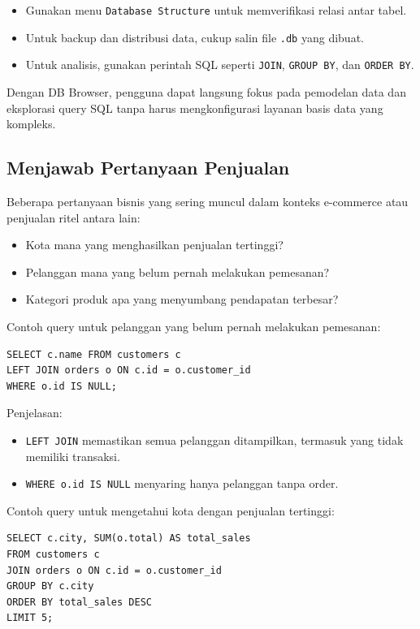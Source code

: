 \begin{itemize}
\item Gunakan menu \texttt{Database Structure} untuk memverifikasi relasi antar tabel.
\item Untuk backup dan distribusi data, cukup salin file \texttt{.db} yang dibuat.
\item Untuk analisis, gunakan perintah SQL seperti \texttt{JOIN}, \texttt{GROUP BY}, dan \texttt{ORDER BY}.
\end{itemize}

Dengan DB Browser, pengguna dapat langsung fokus pada pemodelan data dan eksplorasi query SQL tanpa harus mengkonfigurasi layanan basis data yang kompleks.



\subsection{Menjawab Pertanyaan Penjualan}

Beberapa pertanyaan bisnis yang sering muncul dalam konteks e-commerce atau penjualan ritel antara lain:

\begin{itemize}
	\item Kota mana yang menghasilkan penjualan tertinggi?
	\item Pelanggan mana yang belum pernah melakukan pemesanan?
\item Kategori produk apa yang menyumbang pendapatan terbesar?
\end{itemize}

Contoh query untuk pelanggan yang belum pernah melakukan pemesanan:

\begin{lstlisting}[style=SqlStyle]
SELECT c.name FROM customers c
LEFT JOIN orders o ON c.id = o.customer_id
WHERE o.id IS NULL;
\end{lstlisting}

Penjelasan:
\begin{itemize}
\item \texttt{LEFT JOIN} memastikan semua pelanggan ditampilkan, termasuk yang tidak memiliki transaksi.
\item \texttt{WHERE o.id IS NULL} menyaring hanya pelanggan tanpa order.
\end{itemize}

Contoh query untuk mengetahui kota dengan penjualan tertinggi:

\begin{lstlisting}[style=SqlStyle]
SELECT c.city, SUM(o.total) AS total_sales
FROM customers c
JOIN orders o ON c.id = o.customer_id
GROUP BY c.city
ORDER BY total_sales DESC
LIMIT 5;
\end{lstlisting}

